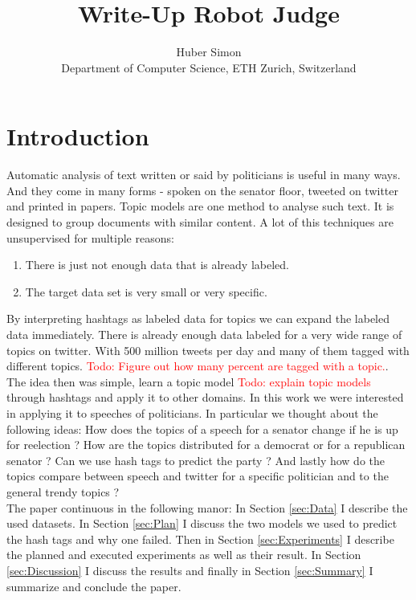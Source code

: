 \documentclass[10pt,conference,compsocconf]{IEEEtran}
\newcommand\todo[1]{\textcolor{red}{Todo: #1}}
\begin{document}
\title{Write-Up Robot Judge}

\author{
  Huber Simon\\
  Department of Computer Science, ETH Zurich, Switzerland
}

\maketitle

\begin{abstract}

\end{abstract}

\section{Introduction}
Automatic analysis of text written or said by politicians is useful in many ways. And they come in many forms - spoken on the senator floor, tweeted on twitter and printed in papers. 
Topic models are one method to analyse such text. It is designed to group documents with similar content. A lot of this techniques are unsupervised for multiple reasons: \begin{enumerate}
	\item There is just not enough data that is already labeled. 
	\item The target data set is very small or very specific. 
\end{enumerate} 
By interpreting hashtags as labeled data for topics we can expand the labeled data immediately. There is already enough data labeled for a very wide range of topics on twitter. With 500 million tweets per day \cite{twitter_stats} and many of them tagged with different topics. \todo{Figure out how many percent are tagged with a topic.}. The idea then was simple, learn a topic model \todo{explain topic models} through hashtags and apply it to other domains. In this work we were interested in applying it to speeches of politicians. In particular we thought about the following ideas: How does the topics of a speech for a senator change if he is up for reelection ? How are the topics distributed for a democrat or for a republican senator ? Can we use hash tags to predict the party ? And lastly how do the topics compare between speech and twitter for a specific politician and to the general trendy topics ? \\
The paper continuous in the following manor: In Section \ref{sec:Data} I describe the used datasets. In Section \ref{sec:Plan} I discuss the two models we used to predict the hash tags and why one failed. Then in Section \ref{sec:Experiments} I describe the planned and executed experiments as well as their result. In Section \ref{sec:Discussion} I discuss the results and finally in Section \ref{sec:Summary} I summarize and conclude the paper. 
\end{document}
